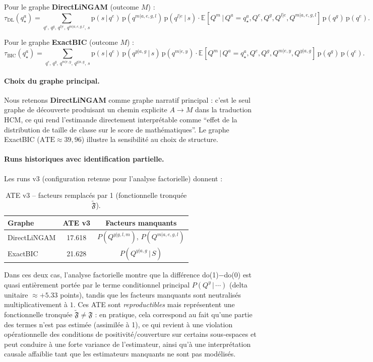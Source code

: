 \documentclass[11pt,a4paper]{article}
\newcommand{\EE}[2]{\mathbb{E}_{#1}\left[ #2 \right]}
\newcommand{\g}{\,\vert\,}
\newcommand{\pr}{\mathrm{p}}
\begin{document}
Pour le graphe \textbf{DirectLiNGAM} (outcome $M$) :
\[
\tau_{\mathrm{DL}}(q^a_\star)
= \sum_{q^e,\, q^g,\, q^{l|e},\, q^{m|a,e,g,l},\, s}
  \pr(s \g q^e)\, \pr(q^{m|a,e,g,l})\, \pr(q^{l|e} \g s)
  \cdot \EE{}{Q^m \g Q^a{=}q^a_\star, Q^e, Q^g, Q^{l|e}, Q^{m|a,e,g,l}}\,
  \pr(q^g)\, \pr(q^e).
\]

Pour le graphe \textbf{ExactBIC} (outcome $M$) :
\[
\tau_{\mathrm{BIC}}(q^a_\star)
= \sum_{q^e,\, q^g,\, q^{m|e,y},\, q^{y|a,g},\, s}
  \pr(s \g q^e)\, \pr(q^{y|a,g} \g s)\, \pr(q^{m|e,y})
  \cdot \EE{}{Q^m \g Q^a{=}q^a_\star, Q^e, Q^g, Q^{m|e,y}, Q^{y|a,g}}\,
  \pr(q^g)\, \pr(q^e).
\]

\paragraph{Choix du graphe principal.}
Nous retenons \textbf{DirectLiNGAM} comme graphe narratif principal : c'est le seul graphe de découverte produisant un chemin explicite $A \to M$ dans la traduction HCM, ce qui rend l'estimande directement interprétable comme ``effet de la distribution de taille de classe sur le score de mathématiques''. Le graphe ExactBIC ($\mathrm{ATE} \approx 39{,}96$) illustre la sensibilité au choix de structure.

\paragraph{Runs historiques avec identification partielle.}
Les runs v3 (configuration retenue pour l'analyse factorielle) donnent :

\begin{table}[H]
\centering
\caption{ATE v3 -- facteurs remplacés par 1 (fonctionnelle tronquée $\tilde{\mathfrak{F}}$).}
\label{tab:hcm_v3_factor1}
\begin{tabular}{lcc}
\toprule
Graphe & ATE v3 & Facteurs manquants \\
\midrule
DirectLiNGAM & 17.618 & $P(Q^{y|g,l,m})$, $P(Q^{m|a,e,g,l})$ \\
ExactBIC     & 21.628 & $P(Q^{y|a,g} \g S)$ \\
\bottomrule
\end{tabular}
\end{table}

Dans ces deux cas, l'analyse factorielle montre que la différence do(1)$-$do(0) est quasi entièrement portée par le terme conditionnel principal $P(Q^y \g \cdots)$ (delta unitaire $\approx +5.33$ points), tandis que les facteurs manquants sont neutralisés multiplicativement à $1$. Ces ATE sont \emph{reproductibles} mais représentent une fonctionnelle tronquée $\tilde{\mathfrak{F}} \neq \mathfrak{F}$ : en pratique, cela correspond au fait qu'une partie des termes n'est pas estimée (assimilée à 1), ce qui revient à une violation opérationnelle des conditions de positivité/couverture sur certains sous-espaces et peut conduire à une forte variance de l'estimateur, ainsi qu'à une interprétation causale affaiblie tant que les estimateurs manquants ne sont pas modélisés.
\end{document}
